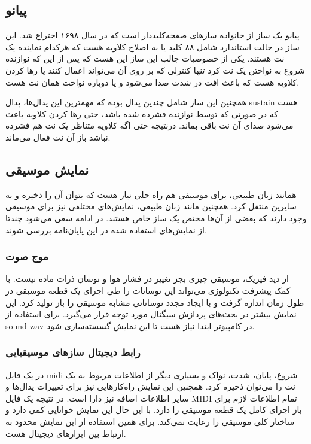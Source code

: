 \subsection{پیانو}
پیانو یک ساز از خانواده ساز‌های صفحه‌کلیددار است که در سال ۱۶۹۸ اختراع شد. این
ساز در حالت استاندارد شامل ۸۸ کلید یا به اصلاح کلاویه هست که هرکدام نماینده یک
نت هستند. یکی از خصوصیات جالب این ساز این هست که پس از این که نوازنده شروع به
نواختن یک نت کرد تنها کنترلی که بر روی آن می‌تواند اعمال کنند یا رها کردن کلاویه
هست که باعث افت در شدت صدا می‌شود و یا دوباره نواخت همان نت هست.

همچنین این ساز شامل چندین پدال بوده که مهمترین این پدال‌ها، پدال \gls{sustain}
هست که در صورتی که توسط نوازنده فشرده شده باشد، حتی رها کردن کلاویه باعث می‌شود
صدای آن نت باقی بماند. درنتیجه حتی اگه کلاویه متناظر یک نت هم فشرده نباشد باز آن
نت فعال می‌ماند.

\subsection{نمایش موسیقی}
همانند زبان طبیعی، برای موسیقی هم راه حلی نیاز هست که بتوان آن را ذخیره و به
سایرین منتقل کرد. همچنین مانند زبان طبیعی، نمایش‌های مختلفی نیز برای موسیقی وجود
دارند که بعضی‌ از آن‌ها مختص یک ساز خاص هستند. در ادامه سعی می‌شود چندتا از
نمایش‌های استفاده شده در این پایان‌نامه بررسی شوند.

\subsubsection{موج صوت}
از دید فیزیک، موسیقی چیزی بجز تغییر در فشار هوا و نوسان ذرات ماده نیست. با کمک
پیشرفت تکنولوژی می‌تواند این نوسانات را طی اجرای یک قطعه موسیقی در طول زمان
اندازه گرفت و با ایجاد مجدد نوساناتی مشابه موسیقی را باز تولید کرد. این نمایش
بیشتر در بحث‌های پردازش سیگنال مورد توجه قرار می‌گیرد. برای استفاده از
\gls{sound wav} در کامپیوتر ابتدا نیاز هست تا این نمایش گسسته‌سازی شود.

\subsubsection{رابط دیجیتال سازهای موسیقیایی}
در یک فایل \gls{midi} شروع، پایان، شدت، نواک و بسیاری دیگر از اطلاعات مربوط به
یک نت را می‌توان ذخیره کرد. همچنین این نمایش راه‌کارهایی نیز برای تغییرات
پدال‌ها و سایر اطلاعات اضافه نیز دارا است. در نتیجه یک فایل \gls{MIDI} تمام
اطلاعات لازم برای باز اجرای کامل یک قطعه موسیقی را دارد. با این حال این
نمایش خوانایی کمی‌ دارد و ساختار کلی موسیقی را رعایت نمی‌کند. برای همین استفاده
از این نمایش محدود به ارتباط بین ابزارهای دیجیتال هست.

